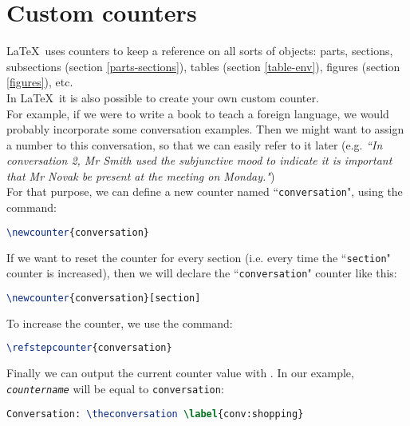 \newpage

\section{Custom counters} \label{custom-counters}

\LaTeX\ uses counters to keep a reference on all sorts of objects: parts, sections, subsections (section  \ref{parts-sections}), tables (section \ref{table-env}), figures (section \ref{figures}), etc. \\


In \LaTeX\, it is also possible to create your own custom counter. \\

For example, if we were to write a book to teach a foreign language, we would probably incorporate some conversation examples. Then we might want to assign a number to this conversation, so that we can easily refer to it later (e.g. \emph{``In conversation 2, Mr Smith used the \emph{subjunctive mood} to indicate it is important that Mr Novak \emph{be} present at the meeting on Monday."}) \\

For that purpose, we can define a new counter named ``\texttt{conversation}", using the 
 command:
\begin{lstlisting}[language=tex]
\newcounter{conversation}
\end{lstlisting}


If we want to reset the counter for every section (i.e. every time the ``\texttt{section}" counter is increased), then we will declare the ``\texttt{conversation}" counter like this:
\begin{lstlisting}[language=tex]
\newcounter{conversation}[section]
\end{lstlisting}



To increase the counter, we use the  command:
\begin{lstlisting}[language=tex]
\refstepcounter{conversation}
\end{lstlisting}

Finally we can output the current counter value with . In our example, \texttt{\emph{countername}} will be equal to \texttt{conversation}:

\begin{lstlisting}[language=tex]
Conversation: \theconversation \label{conv:shopping}
\end{lstlisting}

